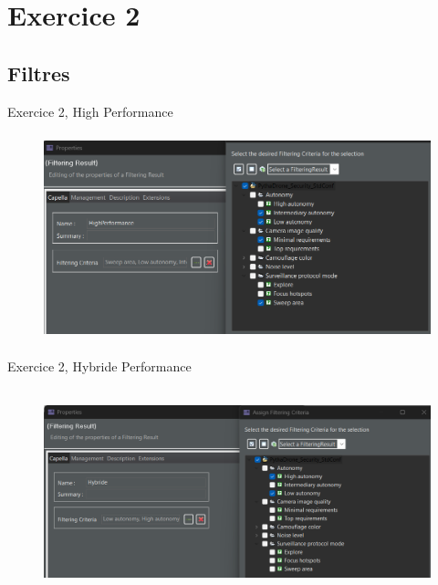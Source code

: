 \documentclass[aspectratio=1610]{beamer}
\begin{document}
    \section{Exercice 2}

    \subsection{Filtres}
    \begin{frame}{Exercice 2, High Performance}
        \begin{figure}[H]
            \centering
            \includegraphics[width=\textwidth, height=6cm, keepaspectratio]{./images/EX2/CSC_5RO08_TA_EX2_Filter_High.png}
        \end{figure}
    \end{frame}
    \begin{frame}{Exercice 2, Hybride Performance}
        \begin{figure}[H]
            \centering
            \includegraphics[width=\textwidth, height=6cm, keepaspectratio]{./images/EX2/CSC_5RO08_TA_EX2_Filter_Hybride.png}
        \end{figure}
    \end{frame}
\end{document}
